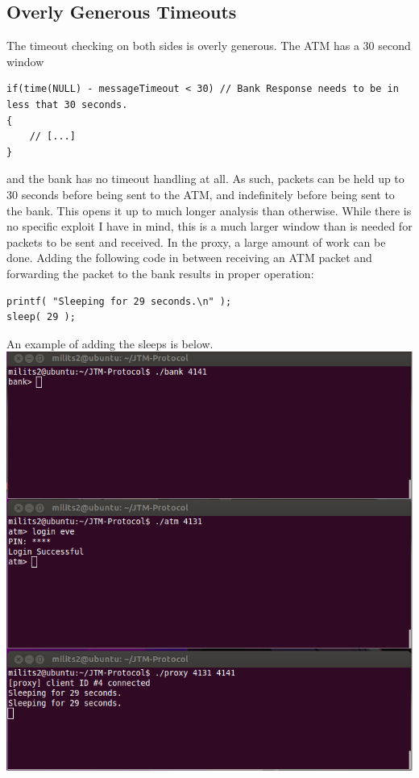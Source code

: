 \documentclass{article}
\begin{document}
\subsection{Overly Generous Timeouts}
The timeout checking on both sides is overly generous. The ATM has a 30 second window
\begin{lstlisting}
if(time(NULL) - messageTimeout < 30) // Bank Response needs to be in less that 30 seconds.
{
    // [...]
}
\end{lstlisting}
and the bank has no timeout handling at all. As such, packets can be held up to 30 seconds before being sent to the ATM, and indefinitely before being sent to the bank. This opens it up to much longer analysis than otherwise. While there is no specific exploit I have in mind, this is a much larger window than is needed for packets to be sent and received. In the proxy, a large amount of work can be done. Adding the following code in between receiving an ATM packet and forwarding the packet to the bank results in proper operation:
\begin{lstlisting}
printf( "Sleeping for 29 seconds.\n" );
sleep( 29 );
\end{lstlisting}
An example of adding the sleeps is below.
\\
\includegraphics[scale=0.5]{slowLogin.png}
\\
\end{document}
